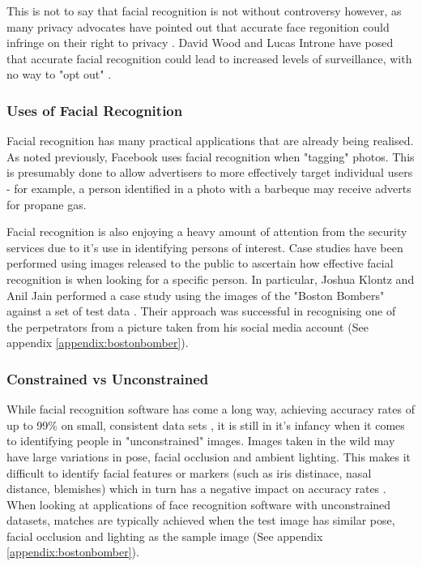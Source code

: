 \documentclass[12pt]{article}
\begin{document}
This is not to say that facial recognition is not without controversy however, as many privacy advocates have pointed out that accurate face regonition could infringe on their right to privacy \citep{gchqmasssurveillance}. David Wood and Lucas Introne have posed that accurate facial recognition could lead to increased levels of surveillance, with no way to "opt out" \citep{facialrecogpolitics}\citep{facialrecogsecurityvsprivacy}.

\subsubsection{Uses of Facial Recognition}
Facial recognition has many practical applications that are already being realised. As noted previously, Facebook uses facial recognition when "tagging" photos. This is presumably done to allow advertisers to more effectively target individual users - for example, a person identified in a photo with a barbeque may receive adverts for propane gas.

Facial recognition is also enjoying a heavy amount of attention from the security services due to it's use in identifying persons of interest. Case studies have been performed using images released to the public to ascertain how effective facial recognition is when looking for a specific person. In particular, Joshua Klontz and Anil Jain performed a case study using the images of the "Boston Bombers" against a set of test data \citep{bostonbombingcasestudy}. Their approach was successful in recognising one of the perpetrators from a picture taken from his social media account (See appendix \ref{appendix:bostonbomber}).

\subsubsection{Constrained vs Unconstrained}
While facial recognition software has come a long way, achieving accuracy rates of up to 99\% on small, consistent data sets \citep{facialrecogidentifyingpoi}, it is still in it's infancy when it comes to identifying people in "unconstrained" images. Images taken in the wild may have large variations in pose, facial occlusion and ambient lighting. This makes it difficult to identify facial features or markers (such as iris distinace, nasal distance, blemishes) which in turn has a negative impact on accuracy rates \citep{unconstrainedfacialrecogbenchmark}. When looking at applications of face recognition software with unconstrained datasets, matches are typically achieved when the test image has similar pose, facial occlusion and lighting as the sample image (See appendix \ref{appendix:bostonbomber}).
\end{document}

